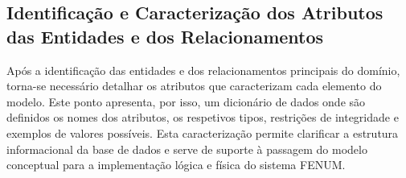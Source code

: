 \documentclass[12pt,a4paper]{article}
\begin{document}
\subsection{Identificação e Caracterização dos Atributos das Entidades e dos Relacionamentos}

Após a identificação das entidades e dos relacionamentos principais do domínio,
torna-se necessário detalhar os atributos que caracterizam cada elemento do
modelo. Este ponto apresenta, por isso, um dicionário de dados onde são
definidos os nomes dos atributos, os respetivos tipos, restrições de integridade
e exemplos de valores possíveis. Esta caracterização permite clarificar a
estrutura informacional da base de dados e serve de suporte à passagem do modelo
conceptual para a implementação lógica e física do sistema FENUM.
\end{document}

